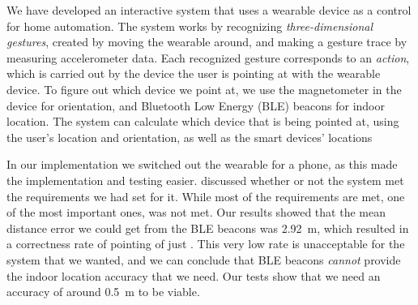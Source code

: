 We have developed an interactive system that uses a wearable device as a control for home automation. 
The system works by recognizing \emph{three-dimensional gestures}, 
created by moving the wearable around, 
and making a gesture trace by measuring accelerometer data. 
Each recognized gesture corresponds to an \emph{action}, 
which is carried out by the device the user is pointing at with the wearable device. 
To figure out which device we point at, 
we use the magnetometer in the device for orientation, 
and Bluetooth Low Energy (BLE) beacons for indoor location. 
The system can calculate which device that is being pointed at, 
using the user's location and orientation, 
as well as the smart devices' locations 

In our implementation we switched out the wearable for a phone, 
as this made the implementation and testing easier. 
 discussed whether or not the system met the requirements we had set for it. 
While most of the requirements are met, 
one of the most important ones,
was not met. 
Our results showed that the mean distance error we could get from the BLE beacons was \SI{2.92}{\meter},
which resulted in a correctness rate of pointing of just . 
This very low rate is unacceptable for the system that we wanted, 
and we can conclude that BLE beacons \emph{cannot} provide the indoor location accuracy that we need. 
Our tests show that we need an accuracy of around \SI{0.5}{\meter} to be viable. 

